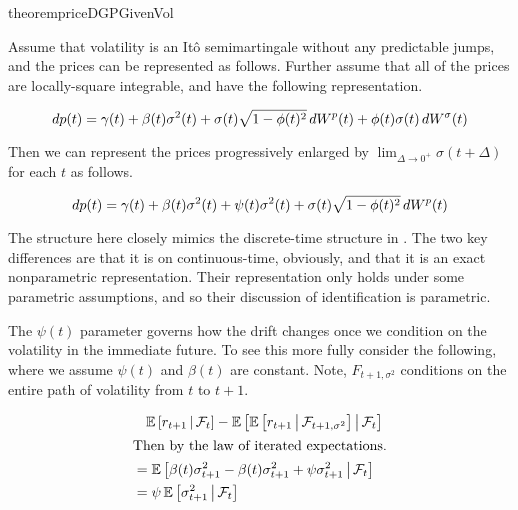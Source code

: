 \documentclass[11pt, letterpaper, twoside, final]{article}
\begin{document}
\begin{restatable}{theorem}{priceDGPGivenVol}
    \label{defn:logPriceGivenVol}

    Assume that volatility is an It\^{o} semimartingale without any predictable jumps, and the prices can be
    represented as follows.
    Further assume that all of the prices are locally-square integrable, and have the following representation.

    \begin{equation}
        \mathop{}\!d p(t) = \gamma(t) + \beta(t) \sigma^2(t) + \sigma(t) \sqrt{1 - \phi(t)^2} \mathop{}\!d W^p(t) + \phi(t)
        \sigma(t) \mathop{}\!d W^{\sigma}(t) 
    \end{equation}

    Then we can represent the prices progressively enlarged by $\lim_{\Delta \to 0^{+}} \sigma(t + \Delta)$ for
    each $t$ as follows.

    \begin{equation}
        \label{eqn:eqn:price_process_decomp}
        \mathop{}\!d p(t) = \gamma(t) + \beta(t) \sigma^2(t) + \psi(t) \sigma^2(t) + \sigma(t) \sqrt{1 - \phi(t)^2} \mathop{}\!d
        W^p(t) 
    \end{equation}

\end{restatable}

The structure here closely mimics the discrete-time structure in \textcite{khrapov2016affine}.
The two key differences are that it is on continuous-time, obviously, and that it is an exact nonparametric
representation.
Their representation only holds under some parametric assumptions, and so their discussion of identification is
parametric.


The $\psi(t)$ parameter governs how the drift changes once we condition on the volatility in the immediate
future.
To see this more fully consider the following, where we assume $\psi(t)$ and $\beta(t)$ are constant.
Note, $F_{t+1, \sigma^2}$ conditions on the entire path of volatility from $t$ to $t+1$.


\begin{align}
    &\phantom{=} \operatorname{\mathbb{E}}\left[r_{t+1} \,\middle\vert\, \mathcal{F}_{t}\right]  - \operatorname{\mathbb{E}}\left[\operatorname{\mathbb{E}}\left[r_{t+1} \,\middle\vert\, \mathcal{F}_{t+1, \sigma^2} \right]
      \,\middle\vert\, \mathcal{F}_t \right]  \\
      \intertext{Then by the law of iterated expectations.}
    &=  \operatorname{\mathbb{E}}\left[\beta(t) \sigma^2_{t+1} - \beta(t) \sigma^2_{t+1} + \psi \sigma^2_{t+1}  \,\middle\vert\, \mathcal{F}_t \right] \\
      \label{eqn:change_in_expected_rtn}
      &= \psi \operatorname{\mathbb{E}}\left[\sigma^2_{t+1} \,\middle\vert\, \mathcal{F}_t \right]
\end{align}
\end{document}
